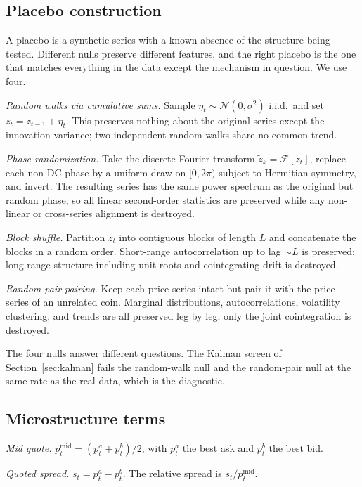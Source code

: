 \documentclass[11pt]{article}
\begin{document}
\subsection{Placebo construction}
\label{app:placebo}

A placebo is a synthetic series with a known absence of the structure being tested.
Different nulls preserve different features, and the right placebo is the one that matches
everything in the data except the mechanism in question. We use four.

\emph{Random walks via cumulative sums.} Sample $\eta_t \sim \mathcal{N}(0, \sigma^2)$
i.i.d.~and set $z_t = z_{t-1} + \eta_t$. This preserves nothing about the original series
except the innovation variance; two independent random walks share no common trend.

\emph{Phase randomization.} Take the discrete Fourier transform $\tilde{z}_k =
\mathcal{F}[z_t]$, replace each non-DC phase by a uniform draw on $[0, 2\pi)$ subject to
Hermitian symmetry, and invert. The resulting series has the same power spectrum as the
original but random phase, so all linear second-order statistics are preserved while any
non-linear or cross-series alignment is destroyed.

\emph{Block shuffle.} Partition $z_t$ into contiguous blocks of length $L$ and concatenate
the blocks in a random order. Short-range autocorrelation up to lag $\sim L$ is preserved;
long-range structure including unit roots and cointegrating drift is destroyed.

\emph{Random-pair pairing.} Keep each price series intact but pair it with the price series
of an unrelated coin. Marginal distributions, autocorrelations, volatility clustering, and
trends are all preserved leg by leg; only the joint cointegration is destroyed.

The four nulls answer different questions. The Kalman screen of Section~\ref{sec:kalman}
fails the random-walk null and the random-pair null at the same rate as the real data,
which is the diagnostic.

\subsection{Microstructure terms}
\label{app:micro}

\emph{Mid quote.} $p^{\mathrm{mid}}_t = (p^a_t + p^b_t)/2$, with $p^a_t$ the best ask and
$p^b_t$ the best bid.

\emph{Quoted spread.} $s_t = p^a_t - p^b_t$. The relative spread is $s_t /
p^{\mathrm{mid}}_t$.
\end{document}
